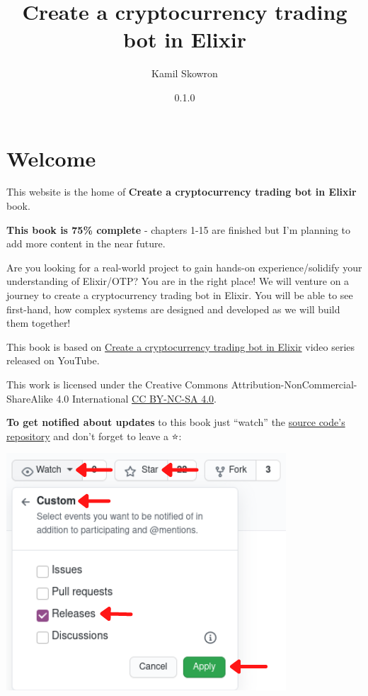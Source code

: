 \documentclass[
  oneside]{book}
\title{Create a cryptocurrency trading bot in Elixir}
\author{Kamil Skowron}
\date{0.1.0}
\begin{document}
\maketitle

{
\setcounter{tocdepth}{1}
\tableofcontents
}
\hypertarget{welcome}{%
\chapter*{Welcome 👋}\label{welcome}}

This website is the home of \textbf{Create a cryptocurrency trading bot in Elixir} book.

\textbf{This book is 75\% complete} - chapters 1-15 are finished but I'm planning to add more content in the near future.

Are you looking for a real-world project to gain hands-on experience/solidify your understanding of Elixir/OTP? You are in the right place! We will venture on a journey to create a cryptocurrency trading bot in Elixir. You will be able to see first-hand, how complex systems are designed and developed as we will build them together!

This book is based on \href{https://www.youtube.com/watch?v=wVYIx7M6o28\&list=PLxsE19GnjC5Nv1CbeKOiS5YqGqw35aZFJ}{Create a cryptocurrency trading bot in Elixir} video series released on YouTube.

This work is licensed under the Creative Commons Attribution-NonCommercial-ShareAlike 4.0 International \href{https://creativecommons.org/licenses/by-nc-sa/4.0/}{CC BY-NC-SA 4.0}.

\textbf{To get notified about updates} to this book just ``watch'' the \href{https://github.com/frathon/create-a-cryptocurrency-trading-bot-in-elixir}{source code's repository} and don't forget to leave a ⭐:

\includegraphics{images/watch_book_howto.png}
\end{document}
